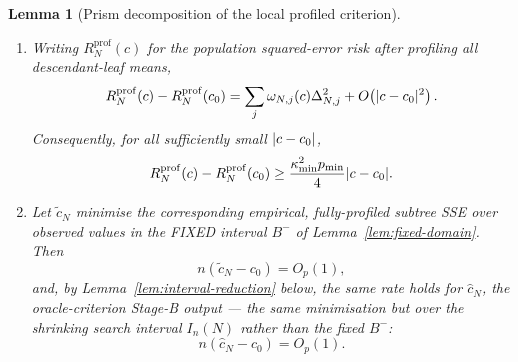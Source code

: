\documentclass[11pt]{article}
\theoremstyle{plain}
\newtheorem{lemma}[theorem]{Lemma}
\theoremstyle{definition}
\theoremstyle{remark}
\DeclarePairedDelimiter{\abs}{\lvert}{\rvert}
\begin{document}
\begin{lemma}[Prism decomposition of the local profiled criterion]
\begin{enumerate}[label=(\roman*),leftmargin=*]
  \item Writing \(R_N^{\mathrm{prof}}(c)\) for the population squared-error
  risk after profiling all descendant-leaf means,
  \begin{equation}
  \label{eq:prism-risk}
    R_N^{\mathrm{prof}}(c)-R_N^{\mathrm{prof}}(c_0)
    =
    \sum_j \omega_{N,j}(c)\Delta_{N,j}^2
    +O\!\left(\abs{c-c_0}^2\right).
  \end{equation}
  Consequently, for all sufficiently small \(\abs{c-c_0}\),
  \begin{equation}
  \label{eq:prism-drift}
    R_N^{\mathrm{prof}}(c)-R_N^{\mathrm{prof}}(c_0)
    \ge
    \frac{\kappa_{\min}^2p_{\min}}{4}
    \abs{c-c_0}.
  \end{equation}

  \item Let \(\widetilde c_N\) minimise the corresponding empirical,
  fully-profiled subtree SSE over observed values in the FIXED interval
  \(B^-\) of Lemma~\ref{lem:fixed-domain}. Then
  \[
    n(\widetilde c_N-c_0)=O_p(1),
  \]
  and, by Lemma~\ref{lem:interval-reduction} below, the same rate holds for
  \(\widehat c_N\), the oracle-criterion Stage-B output --- the same
  minimisation but over the shrinking search interval \(I_n(N)\) rather than
  the fixed \(B^-\):
  \[
    n(\widehat c_N-c_0)=O_p(1).
  \]
\end{enumerate}
\end{lemma}
\end{document}
